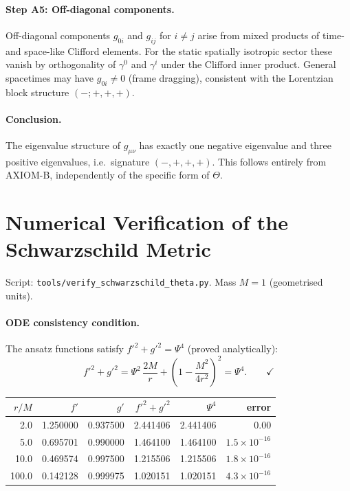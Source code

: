 \documentclass[12pt,a4paper]{article}
\theoremstyle{definition}
\theoremstyle{remark}
\begin{document}
\paragraph{Step A5: Off-diagonal components.}
Off-diagonal components $g_{0i}$ and $g_{ij}$ for $i \neq j$ arise from
mixed products of time- and space-like Clifford elements.
For the static spatially isotropic sector these vanish by orthogonality
of $\gamma^0$ and $\gamma^i$ under the Clifford inner product.
General spacetimes may have $g_{0i} \neq 0$ (frame dragging), consistent
with the Lorentzian block structure $(-;+,+,+)$.

\paragraph{Conclusion.}
The eigenvalue structure of $g_{\mu\nu}$ has exactly one negative eigenvalue
and three positive eigenvalues, i.e.\ signature $(-,+,+,+)$.
This follows entirely from AXIOM-B, independently of the specific form of $\Theta$.

\section{Numerical Verification of the Schwarzschild Metric}
\label{app:numerics}

Script: \texttt{tools/verify\_schwarzschild\_theta.py}.
Mass $M = 1$ (geometrised units).

\paragraph{ODE consistency condition.}
The ansatz functions satisfy $f'^2 + g'^2 = \Psi^4$ (proved analytically):
\[
  f'^2 + g'^2
  = \Psi^2\,\frac{2M}{r} + \left(1 - \frac{M^2}{4r^2}\right)^2
  = \Psi^4. \qquad \checkmark
\]

\begin{center}
\begin{tabular}{rrrrrr}
\toprule
$r/M$ & $f'$ & $g'$ & $f'^2+g'^2$ & $\Psi^4$ & error \\
\midrule
2.0   & 1.250000 & 0.937500 & 2.441406 & 2.441406 & $0.00$               \\
5.0   & 0.695701 & 0.990000 & 1.464100 & 1.464100 & $1.5\times10^{-16}$  \\
10.0  & 0.469574 & 0.997500 & 1.215506 & 1.215506 & $1.8\times10^{-16}$  \\
100.0 & 0.142128 & 0.999975 & 1.020151 & 1.020151 & $4.3\times10^{-16}$  \\
\bottomrule
\end{tabular}
\end{center}
\end{document}
